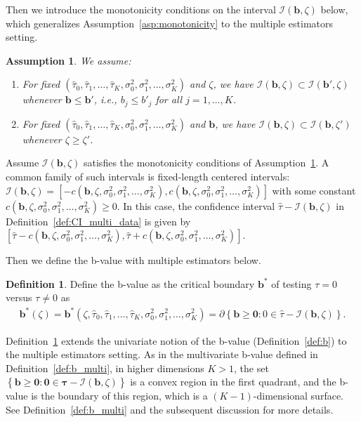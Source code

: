 \documentclass[11pt]{article}
\def\cI{{\mathcal I}}
\newcommand{\htau}{\widehat\tau}
\numberwithin{equation}{section}
\newtheorem{assumption}{Assumption}[section]
\theoremstyle{definition}
\newtheorem{definition}{Definition}[section]
\begin{document}
Then we introduce the monotonicity conditions on the interval $\cI(\bm{b}, \zeta)$ below, which generalizes Assumption~\ref{asp:monotonicity} to the multiple estimators setting.

\begin{assumption}\label{asp:monotonicity_multi_data}
  We assume:
  \begin{enumerate}
    \item For fixed $(\htau_0, \htau_1, \ldots, \htau_K, \sigma_0^2, \sigma_1^2, \ldots, \sigma_K^2)$ and $\zeta$, we have $\cI(\bm{b}, \zeta) \subset \cI(\bm{b'}, \zeta)$ whenever $\bm{b} \le \bm{b'}$, i.e., $b_j \le b'_j$ for all $j=1,\ldots,K$.
    \item For fixed $(\htau_0, \htau_1, \ldots, \htau_K, \sigma_0^2, \sigma_1^2, \ldots, \sigma_K^2)$ and $\bm{b}$, we have $\cI(\bm{b}, \zeta) \subset \cI(\bm{b}, \zeta')$ whenever $\zeta \ge \zeta'$.
  \end{enumerate}
\end{assumption}

Assume $\cI(\bm{b},\zeta)$ satisfies the monotonicity conditions of Assumption~\ref{asp:monotonicity_multi_data}. A common family of such intervals is fixed-length centered intervals: $\cI(\bm{b}, \zeta) = [-c(\bm{b}, \zeta, \sigma_0^2, \sigma_1^2, \ldots, \sigma_K^2), c(\bm{b}, \zeta, \sigma_0^2, \sigma_1^2, \ldots, \sigma_K^2)]$ with some constant $c(\bm{b}, \zeta, \sigma_0^2, \sigma_1^2, \ldots, \sigma_K^2) \ge 0$. In this case, the confidence interval $\hat\tau - \cI(\bm{b}, \zeta)$ in Definition~\ref{def:CI_multi_data} is given by $[\hat\tau - c(\bm{b}, \zeta, \sigma_0^2, \sigma_1^2, \ldots, \sigma_K^2), \hat\tau + c(\bm{b}, \zeta, \sigma_0^2, \sigma_1^2, \ldots, \sigma_K^2)]$.

Then we define the b-value with multiple estimators below.
\begin{definition}\label{def:b_multi_data}
  Define the b-value as the critical boundary $\bm{b}^*$ of testing $\tau = 0$ versus $\tau \neq 0$ as
  \begin{align}\label{eq:b_multi_data}
    \bm{b}^*(\zeta) = \bm{b}^*(\zeta, \htau_0, \htau_1, \ldots, \htau_K, \sigma_0^2, \sigma_1^2, \ldots, \sigma_K^2) = \partial\left\{\bm{b} \ge \bm{0}: 0 \in \hat\tau - \bm{\cI}(\bm{b}, \zeta)\right\}.
  \end{align}
\end{definition}

Definition~\ref{def:b_multi_data} extends the univariate notion of the b-value (Definition~\ref{def:b}) to the multiple estimators setting. As in the multivariate b-value defined in Definition~\ref{def:b_multi}, in higher dimensions $K > 1$, the set $\left\{\bm{b} \ge \bm{0}: \bm{0} \in \bm{\hat\tau} - \bm{\cI}(\bm{b}, \zeta)\right\}$ is a convex region in the first quadrant, and the b-value is the boundary of this region, which is a $(K-1)$-dimensional surface. See Definition~\ref{def:b_multi} and the subsequent discussion for more details.
\end{document}
